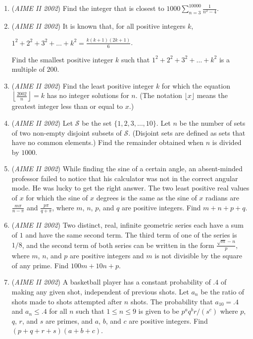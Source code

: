 \begin{enumerate}
 

	\item (\textit{AIME II 2002}) Find the integer that is closest to $1000\sum_{n=3}^{10000}\frac1{n^2-4}$.


 

	\item (\textit{AIME II 2002}) It is known that, for all positive integers $k$,


 $1^2+2^2+3^2+\ldots+k^{2}=\frac{k(k+1)(2k+1)}6$.

 Find the smallest positive integer $k$ such that $1^2+2^2+3^2+\ldots+k^2$ is a multiple of $200$.


 

	\item (\textit{AIME II 2002}) Find the least positive integer $k$ for which the equation $\left\lfloor\frac{2002}{n}\right\rfloor=k$ has no integer solutions for $n$. (The notation $\lfloor x\rfloor$ means the greatest integer less than or equal to $x$.)


 

	\item (\textit{AIME II 2002}) Let $\mathcal{S}$ be the set $\lbrace1,2,3,\ldots,10\rbrace$. Let $n$ be the number of sets of two non-empty disjoint subsets of $\mathcal{S}$. (Disjoint sets are defined as sets that have no common elements.) Find the remainder obtained when $n$ is divided by $1000$.


 

	\item (\textit{AIME II 2002}) While finding the sine of a certain angle, an absent-minded professor failed to notice that his calculator was not in the correct angular mode. He was lucky to get the right answer. The two least positive real values of $x$ for which the sine of $x$ degrees is the same as the sine of $x$ radians are $\frac{m\pi}{n-\pi}$ and $\frac{p\pi}{q+\pi}$, where $m$, $n$, $p$, and $q$ are positive integers. Find $m+n+p+q$.


 

	\item (\textit{AIME II 2002}) Two distinct, real, infinite geometric series each have a sum of $1$ and have the same second term. The third term of one of the series is $1/8$, and the second term of both series can be written in the form $\frac{\sqrt{m}-n}p$, where $m$, $n$, and $p$ are positive integers and $m$ is not divisible by the square of any prime. Find $100m+10n+p$.


 

	\item (\textit{AIME II 2002}) A basketball player has a constant probability of $.4$ of making any given shot, independent of previous shots. Let $a_n$ be the ratio of shots made to shots attempted after $n$ shots. The probability that $a_{10}=.4$ and $a_n\le.4$ for all $n$ such that $1\le n\le9$ is given to be $p^aq^br/\left(s^c\right)$ where $p$, $q$, $r$, and $s$ are primes, and $a$, $b$, and $c$ are positive integers. Find $\left(p+q+r+s\right)\left(a+b+c\right)$.



\end{enumerate}
